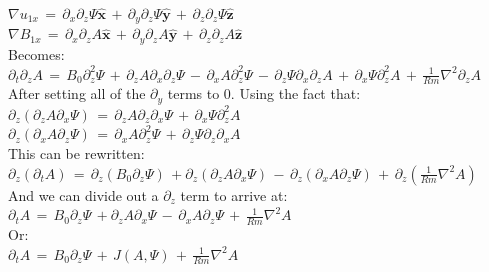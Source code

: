\documentclass[letterpaper,12pt]{article}
\newcommand\reym{\mathrel{Rm}}
\begin{document}
$\nabla u_{1x}  \, = \, \partial_x \partial_z \Psi \mathbf{\hat{x}} \, + \, \partial_y \partial_z \Psi \mathbf{\hat{y}} \, + \, \partial_z \partial_z \Psi \mathbf{\hat{z}}$ \\

$\nabla B_{1x} \, = \, \partial_x \partial_z A \mathbf{\hat{x}} \, + \, \partial_y\partial_z A \mathbf{\hat{y}} \, + \, \partial_z \partial_z A \mathbf{\hat{z}}$ \\

Becomes: \\

$\partial_t \partial_z A \, = \, B_0 \partial_z^2 \Psi \, + \, \partial_z A \partial_x \partial_z \Psi \, - \, \partial_x A \partial_z^2 \Psi \, - \, \partial_z \Psi \partial_x \partial_z A \, + \, \partial_x \Psi \partial_z^2 A \, + \, \frac{1}{\reym} \nabla^2 \partial_z A$ \\

After setting all of the $\partial_y$ terms to 0. Using the fact that: \\

$\partial_z\left(\partial_z A \partial_x \Psi\right) \, = \, \partial_z A \partial_z \partial_x \Psi \, + \, \partial_x \Psi \partial_z^2 A$ \\

$\partial_z\left(\partial_x A \partial_z \Psi\right) \, = \, \partial_x A \partial_z^2 \Psi \, + \, \partial_z \Psi \partial_z \partial_x A$ \\

This can be rewritten: \\

$\partial_z \left(\partial_t A \right) \, = \, \partial_z \left(B_0 \partial_z \Psi \right) \, + \partial_z \left(\partial_z A \partial_x \Psi\right) \, - \, \partial_z\left(\partial_x A \partial_z \Psi \right) \, + \, \partial_z \left(\frac{1}{Rm} \nabla^2 A\right)$ \\

And we can divide out a $\partial_z$ term to arrive at: \\

$\partial_t A \, = \, B_0 \partial_z \Psi \, + \partial_z A \partial_x \Psi \, - \, \partial_x A \partial_z \Psi \, + \, \frac{1}{Rm} \nabla^2 A$ \\

Or: \\

$\partial_t A \, = \, B_0 \partial_z \Psi \, + \, J\left(A, \Psi\right) \, + \, \frac{1}{Rm} \nabla^2 A$ \\
\end{document}
